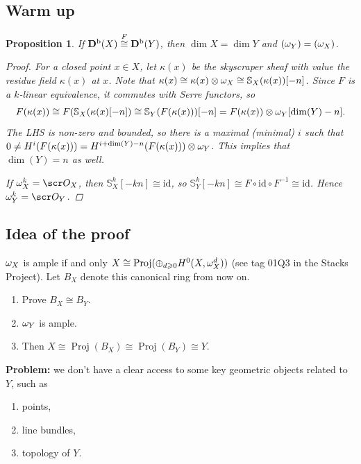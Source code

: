 \documentclass[A4paper, british]{amsart}
\theoremstyle{darkgreentheorem}
\newtheorem{prop}[thm]{Proposition}
\theoremstyle{darkbluedefinition}
\theoremstyle{darkredexample}
\theoremstyle{remark}
\DeclareMathOperator{\Proj}{Proj}
\DeclareMathOperator{\ord}{ord}
\let\ord\relax
\DeclareMathOperator{\ord}{ord}
\renewcommand{\S}{\mathbb{S}}
\newcommand{\1}{\mathbbm{1}}
\newcommand{\ot}{\otimes}
\newcommand{\op}{\oplus}
\newcommand{\id}{\mathrm{id}}
\begin{document}
\subsection{Warm up}

\begin{prop}
    If $\mathbf{D}^{\mathrm{b}}(X)\overset{F}{\cong} \mathbf{D}^{\mathrm{b}}(Y)$, then $\dim{X}=\dim{Y}$ and $\ord(\w_{Y})=\ord(\w_{X})$.
    \begin{proof}
	For a closed point $x\in X$, let $\kappa(x)$ be the skyscraper sheaf with value the residue field $\kappa(x)$ at $x$.
	Note that $\kappa(x)\cong \kappa(x)\ot \w_{X}\cong \S_{X}(\kappa(x))[-n]$.
	Since $F$ is a $k$-linear equivalence, it commutes with Serre functors, so
	\[ F(\kappa(x))\cong F(\S_{X}(\kappa(x)[-n])\cong \S_{Y}(F(\kappa(x)))[-n]=F(\kappa(x))\ot \w_{Y}[\dim(Y)-n]. \]
	The LHS is non-zero and bounded, so there is a maximal (minimal) $i$ such that $0\neq H^{i}(F(\kappa(x)))=H^{i+\dim(Y)-n}(F(\kappa(x)))\ot \w_{Y}$.
	This implies that $\dim(Y)=n$ as well.

	If $\w_{X}^{k}=\O_{X}$, then $\S_{X}^{k}[-kn]\cong \id$, so $\S_{Y}^{k}[-kn]\cong F\circ \id \circ F^{-1}\cong \id$.
	Hence $\w_{Y}^{k}=\O_{Y}$.
    \end{proof}
\end{prop}

\subsection{Idea of the proof}

$\omega_{X}$ is ample if and only $X\cong \Proj(\op_{d\geqslant 0}H^{0}(X,\w_{X}^{d}))$ (see tag 01Q3 in the Stacks Project).
Let $B_{X}$ denote this canonical ring from now on.

\begin{enumerate}
    \item Prove $B_{X}\cong B_{Y}$.
    \item $\omega_{Y}$ is ample.
    \item Then $X\cong \Proj(B_{X})\cong \Proj(B_{Y})\cong Y$.
\end{enumerate}

\textbf{Problem:} we don't have a clear access to some key geometric objects related to $Y$, such as
\begin{enumerate}
    \item points,
    \item line bundles,
    \item topology of $Y$.
\end{enumerate}
\end{document}
